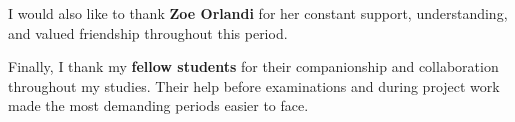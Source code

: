\documentclass[a4paper,10pt,titlepage,twoside]{book}
\numberwithin{equation}{chapter}
\theoremstyle{plain}
\theoremstyle{definition}
\begin{document}
\medskip

I would also like to thank \textbf{Zoe Orlandi} for her constant support,
understanding, and valued friendship throughout this period.

\medskip

Finally, I thank my \textbf{fellow students} for their companionship and
collaboration throughout my studies. Their help before examinations and during
project work made the most demanding periods easier to face.

\cleardoublepage
{}
{}

\renewcommand{\bibname}{References}



\cleardoublepage
\end{document}
